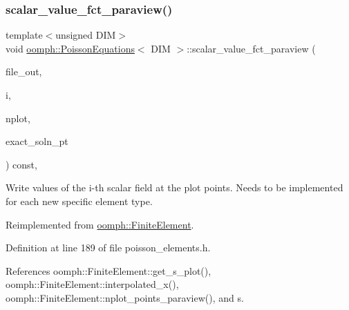 \subsubsection{\texorpdfstring{scalar\+\_\+value\+\_\+fct\+\_\+paraview()}{scalar\_value\_fct\_paraview()}}
{\footnotesize\ttfamily template$<$unsigned D\+IM$>$ \\
void \hyperlink{classoomph_1_1PoissonEquations}{oomph\+::\+Poisson\+Equations}$<$ D\+IM $>$\+::scalar\+\_\+value\+\_\+fct\+\_\+paraview (\begin{DoxyParamCaption}\item[{std\+::ofstream \&}]{file\+\_\+out,  }\item[{const unsigned \&}]{i,  }\item[{const unsigned \&}]{nplot,  }\item[{\hyperlink{classoomph_1_1FiniteElement_a690fd33af26cc3e84f39bba6d5a85202}{Finite\+Element\+::\+Steady\+Exact\+Solution\+Fct\+Pt}}]{exact\+\_\+soln\+\_\+pt }\end{DoxyParamCaption}) const\hspace{0.3cm}{\ttfamily [inline]}, {\ttfamily [virtual]}}



Write values of the i-\/th scalar field at the plot points. Needs to be implemented for each new specific element type. 



Reimplemented from \hyperlink{classoomph_1_1FiniteElement_ac6ce34f52481195e8dba634618ef3f36}{oomph\+::\+Finite\+Element}.



Definition at line 189 of file poisson\+\_\+elements.\+h.



References oomph\+::\+Finite\+Element\+::get\+\_\+s\+\_\+plot(), oomph\+::\+Finite\+Element\+::interpolated\+\_\+x(), oomph\+::\+Finite\+Element\+::nplot\+\_\+points\+\_\+paraview(), and s.

\mbox{\label{classoomph_1_1PoissonEquations_a302df9f1a73fb1404f686a75b2fe58be}} 
